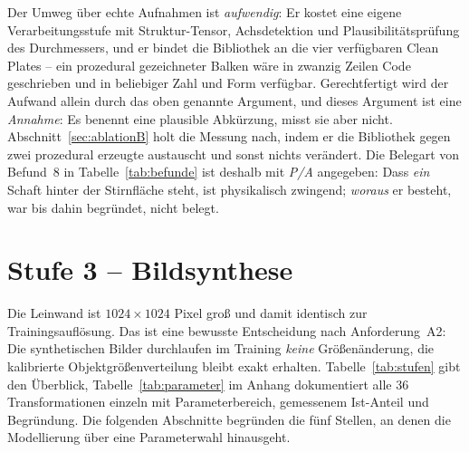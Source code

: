 Der Umweg über echte Aufnahmen ist \emph{aufwendig}: Er kostet eine eigene
Verarbeitungsstufe mit Struktur-Tensor, Achsdetektion und Plausibilitätsprüfung
des Durchmessers, und er bindet die Bibliothek an die vier verfügbaren Clean
Plates -- ein prozedural gezeichneter Balken wäre in zwanzig Zeilen Code
geschrieben und in beliebiger Zahl und Form verfügbar. Gerechtfertigt wird der
Aufwand allein durch das oben genannte Argument, und dieses Argument ist eine
\emph{Annahme}: Es benennt eine plausible Abkürzung, misst sie aber nicht.
Abschnitt~\ref{sec:ablationB} holt die Messung nach, indem er die Bibliothek
gegen zwei prozedural erzeugte austauscht und sonst nichts verändert. Die
Belegart von Befund~8 in Tabelle~\ref{tab:befunde} ist deshalb mit \emph{P/A}
angegeben: Dass \emph{ein} Schaft hinter der Stirnfläche steht, ist physikalisch
zwingend; \emph{woraus} er besteht, war bis dahin begründet, nicht belegt.

\section{Stufe 3 -- Bildsynthese}
\label{sec:synthese}

Die Leinwand ist $1024\times1024$ Pixel groß und damit identisch zur
Trainingsauflösung. Das ist eine bewusste Entscheidung nach Anforderung~A2: Die
synthetischen Bilder durchlaufen im Training \emph{keine} Größenänderung, die
kalibrierte Objektgrößenverteilung bleibt exakt erhalten.
Tabelle~\ref{tab:stufen} gibt den Überblick, Tabelle~\ref{tab:parameter} im
Anhang dokumentiert alle 36 Transformationen einzeln mit Parameterbereich,
gemessenem Ist-Anteil und Begründung. Die folgenden Abschnitte begründen die fünf
Stellen, an denen die Modellierung über eine Parameterwahl hinausgeht.

